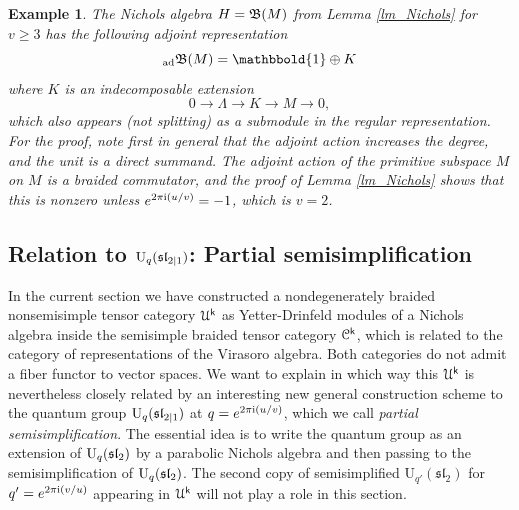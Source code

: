 \documentclass[a4paper, reqno]{amsart}
\newtheorem{example}[theorem]{Example}
\theoremstyle{introTheorems}
\newcommand\cC{\mathcal{C}}
\newcommand\cD{\mathcal{D}}
\newcommand\cU{\mathcal{U}}
\renewcommand\sl{\mathfrak{sl}}
\renewcommand{\1}{\mathbbold{1}}
\begin{document}
 \begin{example}\label{exm:ourNicholsAdjoint}
 The Nichols algebra $H=\mathfrak{B}(M)$ from Lemma \ref{lm_Nichols} for $v\geq 3$ has the following adjoint representation 
$${_{\mathrm{ad}}}\NicholsOf(M)=\1\oplus K$$
 where $K$ is an indecomposable extension 
 $$0 \to \Lambda \to K\to M \to 0,$$
 which also appears (not splitting) as a submodule in the regular representation.
 For the proof, note first in general that the adjoint action increases the degree, and the unit is a direct summand. The adjoint action of the primitive subspace $M$ on $M$ is a braided commutator, and the proof of  Lemma \ref{lm_Nichols} shows that this is nonzero unless $e^{2\pi\mathrm{i}(u/v)}=-1$, which is $v=2$.
 \end{example}
 
\subsection{Relation to \texorpdfstring{$\Uq(\sl_{2|1})$}{Uq(sl(2|1))}: Partial semisimplification}\label{subsec:PartialSemisimplification}


In the current section we have constructed a nondegenerately braided nonsemisimple tensor category $\cU^\k$ as Yetter-Drinfeld modules of a Nichols algebra inside the semisimple braided tensor category $\cC^\k$, which is related to the category of representations of the Virasoro algebra. Both categories do not admit a fiber functor to vector spaces. We want to explain in which way this $\cU^\k$ is nevertheless closely related by an interesting new general construction scheme to the quantum group $\Uq(\sl_{2|1})$ at $q=e^{2\pi\mathrm{i}(u/v)}$, which we call \emph{partial semisimplification}.  The essential idea is to write the quantum group as an extension of $\Uq(\sl_2)$ by a parabolic Nichols algebra and then passing to the semisimplification of $\Uq(\sl_2)$. The second copy of semisimplified $\mathrm{U}_{q'}(\sl_2)$  for $q'=e^{2\pi\mathrm{i}(v/u)}$ appearing in $\cU^\k$ will not play a role in this section.
\end{document}
